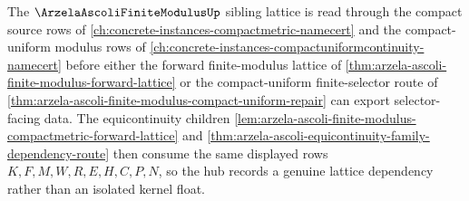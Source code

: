 The $\ArzelaAscoliFiniteModulusUp$ sibling lattice is read through the compact source rows of \autoref{ch:concrete-instances-compactmetric-namecert} and the compact-uniform modulus rows of \autoref{ch:concrete-instances-compactuniformcontinuity-namecert} before either the forward finite-modulus lattice of \autoref{thm:arzela-ascoli-finite-modulus-forward-lattice} or the compact-uniform finite-selector route of \autoref{thm:arzela-ascoli-finite-modulus-compact-uniform-repair} can export selector-facing data. The equicontinuity children \autoref{lem:arzela-ascoli-finite-modulus-compactmetric-forward-lattice} and \autoref{thm:arzela-ascoli-equicontinuity-family-dependency-route} then consume the same displayed rows $K,F,M,W,R,E,H,C,P,N$, so the hub records a genuine lattice dependency rather than an isolated kernel float.
